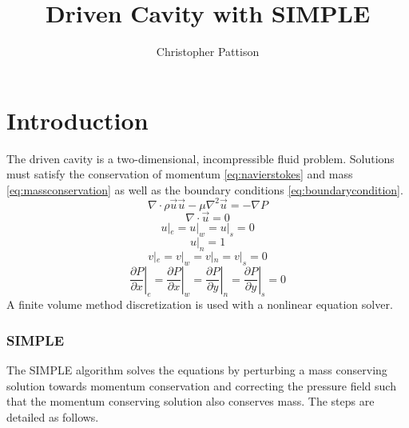 \documentclass[12pt,twocolumn]{article}
\title{\textbf{Driven Cavity with SIMPLE}}
\author{Christopher Pattison}
\date{}
\begin{document}

\section*{Introduction}
The driven cavity is a two-dimensional, incompressible fluid problem.
Solutions must satisfy the conservation of momentum \eqref{eq:navierstokes} and mass \eqref{eq:massconservation} as well as the boundary conditions \eqref{eq:boundarycondition}.
\begin{equation}\label{eq:navierstokes}\nabla\cdot\rho\vec u\vec u - \mu\nabla^2\vec u = -\nabla P\end{equation}
\begin{equation}\label{eq:massconservation}\nabla\cdot\vec u = 0\end{equation}
\begin{equation}\label{eq:boundarycondition}u|_e = u|_w = u|_s = 0\end{equation}
\[u|_n = 1\]
\[v|_e=v|_w=v|_n=v|_s=0\]
\[\left.\frac{\partial P}{\partial x}\right|_e=\left.\frac{\partial P}{\partial x}\right|_w=\left.\frac{\partial P}{\partial y}\right|_n=\left.\frac{\partial P}{\partial y}\right|_s=0\]
A finite volume method discretization is used with a nonlinear equation solver.

\subsubsection*{SIMPLE}
The SIMPLE algorithm solves the equations by perturbing a mass conserving solution towards momentum conservation and correcting the pressure field such that the momentum conserving solution also conserves mass. The steps are detailed as follows.
\end{document}
